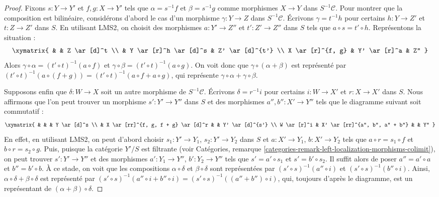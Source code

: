 \begin{proof}
\medskip\noindent
Fixons $s : Y \to Y'$ et $f, g : X \to Y'$ tels que
$\alpha = s^{-1}f$ et $\beta = s^{-1}g$ comme morphismes $X \to Y$
dans $S^{-1}\mathcal{C}$.
Pour montrer que la composition est bilinéaire, considérons d'abord le cas d'un
morphisme $\gamma : Y \to Z$ dans $S^{-1}\mathcal{C}$. Écrivons $\gamma = t^{-1}h$
pour certains $h : Y \to Z'$ et $t : Z \to Z'$ dans $S$. En utilisant LMS2, on
choisit des morphismes $a : Y' \to Z''$ et $t' : Z' \to Z''$ dans $S$ tels
que $a \circ s = t' \circ h$. Représentons la situation :
$$
\xymatrix{
& & Z \ar[d]^t \\
& Y \ar[r]^h \ar[d]^s & Z' \ar[d]^{t'} \\
X \ar[r]^{f, g} & Y' \ar[r]^a & Z''
}
$$
Alors
$\gamma \circ \alpha = (t' \circ t)^{-1}(a \circ f)$ et
$\gamma \circ \beta = (t' \circ t)^{-1}(a \circ g)$.
On voit donc que $\gamma \circ (\alpha + \beta)$ est représenté
par $(t' \circ t)^{-1}(a \circ (f + g)) =
(t' \circ t)^{-1}(a \circ f + a \circ g)$, qui représente
$\gamma \circ \alpha + \gamma \circ \beta$.

\medskip\noindent
Supposons enfin que $\delta : W \to X$ soit un autre morphisme de
$S^{-1}\mathcal{C}$. Écrivons $\delta = r^{-1}i$ pour certains
$i : W \to X'$ et $r : X \to X'$ dans $S$. Nous affirmons que l'on peut trouver
un morphisme $s' : Y' \to Y''$ dans $S$ et des morphismes $a'', b'' : X' \to Y''$
tels que le diagramme suivant soit commutatif :
$$
\xymatrix{
& & & Y \ar[d]^s \\
& X \ar[rr]^{f, g, f + g} \ar[d]^r & & Y' \ar[d]^{s'} \\
W \ar[r]^i & X' \ar[rr]^{a'', b'', a'' + b''} & & Y''
}
$$
En effet, en utilisant LMS2, on peut d'abord choisir
$s_1 : Y' \to Y_1$, $s_2 : Y' \to Y_2$ dans $S$ et
$a : X' \to Y_1$, $b : X' \to Y_2$ tels que
$a \circ r = s_1 \circ f$ et $b \circ r = s_2 \circ g$.
Puis, puisque la catégorie $Y'/S$ est filtrante (voir
Catégories, remarque \ref{categories-remark-left-localization-morphisms-colimit}),
on peut
trouver $s' : Y' \to Y''$ et des morphismes $a' : Y_1 \to Y''$, $b' : Y_2 \to Y''$
tels que $s' = a' \circ s_1$ et $s' = b' \circ s_2$. Il suffit alors de poser
$a'' = a' \circ a$ et $b'' = b' \circ b$.
À ce stade, on voit que les compositions
$\alpha \circ \delta$ et $\beta \circ \delta$ sont représentées par
$(s' \circ s)^{-1}(a'' \circ i)$ et $(s' \circ s)^{-1}(b'' \circ i)$.
Ainsi, $\alpha \circ \delta + \beta \circ \delta$ est représenté
par $(s' \circ s)^{-1}(a'' \circ i + b'' \circ i) =
(s' \circ s)^{-1}((a'' + b'') \circ i)$,
qui, toujours d'après le diagramme, est un représentant
de $(\alpha + \beta) \circ \delta$.
\end{proof}

